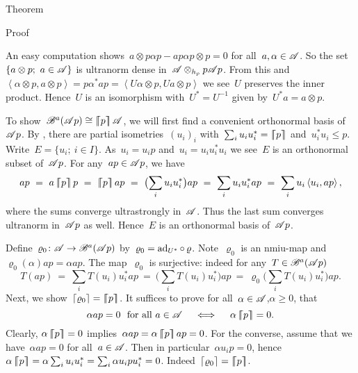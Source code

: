 \documentclass[b]{subfiles}
\begin{document}
\begin{parsec}
\begin{point}{Theorem}
\begin{point}{Proof}
\begin{point}
An easy computation shows~$a \otimes p\alpha p - ap\alpha p \otimes p = 0$
    for all~$a, \alpha \in \mathscr{A}$.
So the set~$\{a \otimes p;\ a\in \mathscr{A}\}$
    is ultranorm dense in~$\mathscr{A} \otimes_{h_p} p \mathscr{A} p$.
From this and
    $\left<\alpha \otimes p, a\otimes p\right> = 
        p \alpha^* a p
        =\left< U \alpha \otimes p, U a \otimes p\right> $
        we see~$U$ preserves the inner product.
Hence~$U$ is an isomorphism with~$U^* = U^{-1}$
    given by~$U^* a = a\otimes p$.
\end{point}
\begin{point}%
To show~$\mathscr{B}^a(\mathscr{A} p) \cong \left\lceil\!\!\left\lceil p\right\rceil\!\!\right\rceil\mathscr{A}$,
we will first find a convenient orthonormal basis of~$\mathscr{A} p$.
By ,
    there are partial isometries~$(u_i)_i$
    with~$\sum_i u_iu_i^* = \left\lceil\!\!\left\lceil p\right\rceil\!\!\right\rceil$
    and~$u_i^*u_i \leq p$.
Write~$E = \{u_i; \ i \in I\}$.
As~$u_i = u_i p$ and~$u_i= u_i u_i^* u_i$
    we see~$E$ is an orthonormal subset of~$\mathscr{A} p$.
For any~$ap \in \mathscr{A} p$, we have
\begin{equation*}
    ap \ =\  a \cceil{p} p
       \ =\  \cceil{p} a p
       \ = \ \bigl(\sum_i u_i u_i^*\bigr) ap
       \ = \ \sum_i u_i u_i^* ap
       \ = \ \sum_i u_i \left<u_i,ap\right>,
\end{equation*}
where the sums converge ultrastrongly in~$\mathscr{A}$.
Thus the last sum converges ultranorm in~$\mathscr{A} p$ as well.
Hence~$E$ is an orthonormal basis of~$\mathscr{A} p$.

Define~$\varrho_0 \colon \mathscr{A} \to \mathscr{B}^a(\mathscr{A} p)$
    by~$\varrho_0 = \mathrm{ad}_{U^*} \mathop{\circ} \varrho$.
Note~$\varrho_0$ is an nmiu-map and~$\varrho_0(\alpha)ap = \alpha ap$.
The map~$\varrho_0$ is surjective:
    indeed for any~$T \in \mathscr{B}^a(\mathscr{A} p)$
\begin{equation*}
    T (ap) \ = \ \sum_i T( u_i ) u_i^* ap
           \ = \ \bigl(\sum_i T( u_i ) u_i^*\bigr) ap
           \ = \ \varrho_0 \bigl(\sum_i T( u_i ) u_i^*\bigr) ap.
\end{equation*}
Next, we show~$\left\lceil\varrho_0\right\rceil = \left\lceil\!\!\left\lceil p\right\rceil\!\!\right\rceil$.
It suffices to prove for all~$\alpha \in \mathscr{A}$,$\alpha \geq 0$, that
\begin{equation*}
    \alpha ap = 0 \text{ \ for all\  } a\in \mathscr{A}
    \quad\iff \quad
    \alpha \left\lceil\!\!\left\lceil p\right\rceil\!\!\right\rceil = 0.
\end{equation*}
    Clearly,
    $\alpha \left\lceil\!\!\left\lceil p\right\rceil\!\!\right\rceil = 0$ implies~$\alpha ap = \alpha \left\lceil\!\!\left\lceil p\right\rceil\!\!\right\rceil ap= 0$.
For the converse, assume that we have~$\alpha ap = 0$ for all~$a\in\mathscr{A}$.
Then in particular~$\alpha u_ip = 0$,
    hence~$\alpha \left\lceil\!\!\left\lceil p\right\rceil\!\!\right\rceil = \alpha \sum_i u_iu_i^*  = \sum_i \alpha u_ipu_i^*=0$.
    Indeed~$\left\lceil\varrho_0\right\rceil = \left\lceil\!\!\left\lceil p\right\rceil\!\!\right\rceil$.


\end{point}
\end{point}
\end{point}
\end{parsec}
\end{document}
